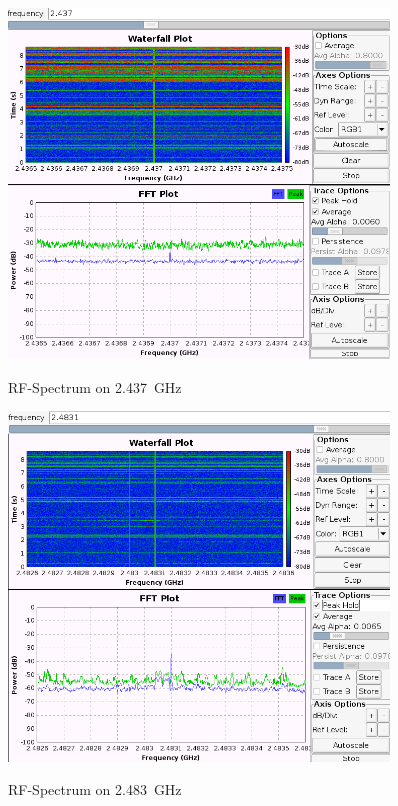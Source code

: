 \begin{figure}[H]
	\centering
\includegraphics[width=0.9\textwidth]{figures/ch6.png}
\label{spectrum2437}
\caption{RF-Spectrum on \SI{2.437}{\giga\hertz}}
\end{figure}

\begin{figure}[H]
	\centering
\includegraphics[width=0.9\textwidth]{figures/ranging_0.png}
\label{spectrum2483}
\caption{RF-Spectrum on \SI{2.483}{\giga\hertz}}
\end{figure}


